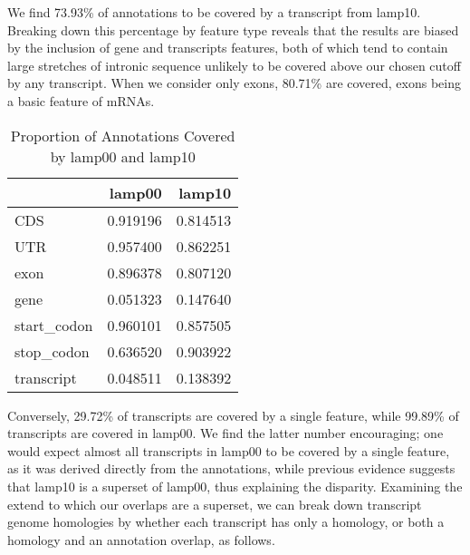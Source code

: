 \documentclass{article}
\begin{document}
We find 73.93\%
 of annotations to be covered by a
transcript from lamp10. Breaking down this percentage by feature type reveals that the results are 
biased by the inclusion of gene and transcripts features, both of which tend to contain large stretches 
of intronic sequence unlikely to be covered above our chosen cutoff by any transcript. When we consider 
only exons, 80.71\%
 are covered, 
exons being a basic feature of mRNAs.

\begin{table}[H]
\caption {Proportion of Annotations Covered by lamp00 and lamp10}
\begin{center}

\begin{tabular}{lrr}
\toprule
{} &    lamp00 &    lamp10 \\
\midrule
CDS         &  0.919196 &  0.814513 \\
UTR         &  0.957400 &  0.862251 \\
exon        &  0.896378 &  0.807120 \\
gene        &  0.051323 &  0.147640 \\
start\_codon &  0.960101 &  0.857505 \\
stop\_codon  &  0.636520 &  0.903922 \\
transcript  &  0.048511 &  0.138392 \\
\bottomrule
\end{tabular}



\end{center}
\end{table}

Conversely, 29.72\%
 of transcripts are 
covered by a single feature, while 99.89\%
 of 
transcripts are covered in lamp00. We find the latter number encouraging; one would expect almost 
all transcripts in lamp00 to be covered by a single feature, as it was derived directly from the 
annotations, while previous evidence suggests that lamp10 is a superset of lamp00, thus explaining 
the disparity. Examining the extend to which our overlaps are a superset, we can break down transcript 
genome homologies by whether each transcript has only a homology, or both a homology and an annotation 
overlap, as follows.
\end{document}
